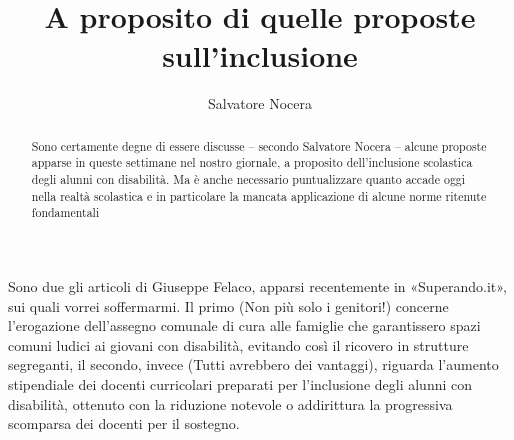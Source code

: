 \author{Salvatore Nocera}
\title{A proposito di quelle proposte sull'inclusione }
\label{nocera020513}
\begin{abstract}
Sono certamente degne di essere discusse – secondo Salvatore Nocera – alcune proposte apparse in queste settimane nel nostro giornale, a proposito dell'inclusione scolastica degli alunni con disabilità. Ma è anche necessario puntualizzare quanto accade oggi nella realtà scolastica e in particolare la mancata applicazione di alcune norme ritenute fondamentali
\end{abstract}
\maketitle
{}
 Sono due gli articoli di Giuseppe Felaco, apparsi recentemente in «Superando.it», sui quali vorrei soffermarmi. Il primo (Non più solo i genitori!\pageref{cha:felaco190413}) concerne l'erogazione dell'assegno comunale di cura alle famiglie che garantissero spazi comuni ludici ai giovani con disabilità, evitando così il ricovero in strutture segreganti, il secondo, invece (Tutti avrebbero dei vantaggi)\pageref{cha:felaco260413}, riguarda l'aumento stipendiale dei docenti curricolari preparati per l'inclusione degli alunni con disabilità, ottenuto con la riduzione notevole o addirittura la progressiva scomparsa dei docenti per il sostegno.

